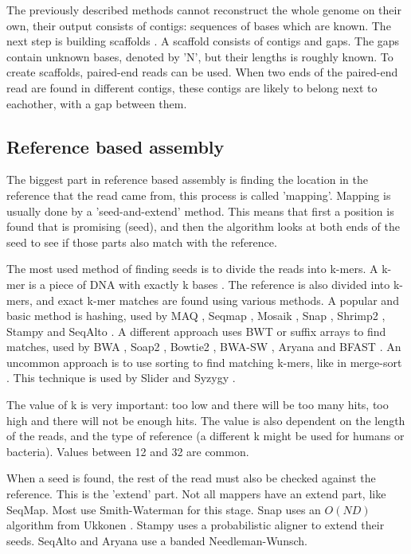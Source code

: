\documentclass[../main/thesis.tex]{subfiles}
\begin{document}
The previously described methods cannot reconstruct the whole genome on their own, their output consists of contigs: sequences of bases which are known.
The next step is building scaffolds \cite{scaffold1}\cite{scaffold2}.
A scaffold consists of contigs and gaps.
The gaps contain unknown bases, denoted by 'N', but their lengths is roughly known.
To create scaffolds, paired-end reads can be used.
When two ends of the paired-end read are found in different contigs, these contigs are likely to belong next to eachother, with a gap between them.


\subsection{Reference based assembly}
The biggest part in reference based assembly is finding the location in the reference that the read came from, this process is called 'mapping'.
Mapping is usually done by a 'seed-and-extend' method.
This means that first a position is found that is promising (seed), and then the algorithm looks at both ends of the seed to see if those parts also match with the reference.

The most used method of finding seeds is to divide the reads into k-mers.
A k-mer is a piece of DNA with exactly k bases \cite{Kmer}.
The reference is also divided into k-mers, and exact k-mer matches are found using various methods.
A popular and basic method is hashing, used by MAQ \cite{maq}, Seqmap \cite{seqmap}, Mosaik \cite{mosaik}, Snap \cite{snap}, Shrimp2 \cite{shrimp2}, Stampy \cite{stampy} and SeqAlto \cite{seqalto}.
A different approach uses BWT \cite{BWT} or suffix arrays \cite{SA} to find matches, used by BWA \cite{bwa}, Soap2 \cite{soap2}, Bowtie2 \cite{bowtie2}, BWA-SW \cite{bwa-sw}, Aryana \cite{aryana} and BFAST \cite{bfast}.
An uncommon approach is to use sorting to find matching k-mers, like in merge-sort \cite{mergesort}\cite{sorting}.
This technique is used by Slider \cite{slider} and Syzygy \cite{syzygy}.

The value of k is very important: too low and there will be too many hits, too high and there will not be enough hits.
The value is also dependent on the length of the reads, and the type of reference (a different k might be used for humans or bacteria).
Values between 12 and 32 are common.

When a seed is found, the rest of the read must also be checked against the reference.
This is the 'extend' part.
Not all mappers have an extend part, like SeqMap.
Most use Smith-Waterman for this stage.
Snap uses an $O(ND)$ algorithm from Ukkonen \cite{O_ND2}.
Stampy uses a probabilistic aligner to extend their seeds.
SeqAlto and Aryana use a banded Needleman-Wunsch.
\end{document}
